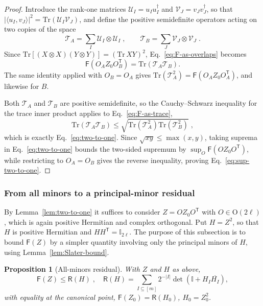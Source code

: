 \documentclass[prx,twocolumn,superscriptaddress,aps,10pt, frontmatterverbose, reprint,footinbib,longbibliography=true]{revtex4-2}
\newtheorem{proposition}{Proposition}
\newcommand{\trans}{\mathsf{T}}
\begin{document}
\begin{proof}
Introduce the rank-one matrices $\mathcal{U}_I=u_Iu_I^\dagger$ and $\mathcal{V}_J=v_Jv_J^\dagger$, so that $|\langle u_I,v_J\rangle|^2=\mathrm{Tr}(\mathcal{U}_I\mathcal{V}_J)$, and define the positive semidefinite operators acting on two copies of the space
\begin{equation}
    \mathcal{T}_A=\sum_I \mathcal{U}_I\otimes \mathcal{U}_I\;,\qquad
    \mathcal{T}_B=\sum_J \mathcal{V}_J\otimes \mathcal{V}_J\;.
\end{equation} 
Since $\mathrm{Tr}\!\left[(X\otimes X)(Y\otimes Y)\right]=\left(\mathrm{Tr}\,XY\right)^2$, Eq.~\eqref{eq:F-as-overlaps} becomes
\begin{equation}
    \mathsf{F}\!\left(O_AZ_0O_B^{\trans}\right)=\mathrm{Tr}\!\left(\mathcal{T}_A\mathcal{T}_B\right).
    \label{eq:F-as-trace}
\end{equation}
The same identity applied with $O_B=O_A$ gives $\mathrm{Tr}(\mathcal{T}_A^2)=\mathsf{F}(O_AZ_0O_A^{\trans})$, and likewise for $B$.

Both $\mathcal{T}_A$ and $\mathcal{T}_B$ are positive semidefinite, so the Cauchy--Schwarz inequality for the trace inner product applies to Eq.~\eqref{eq:F-as-trace},
\begin{equation}
    \mathrm{Tr}\!\left(\mathcal{T}_A\mathcal{T}_B\right)\le\sqrt{\mathrm{Tr}\!\left(\mathcal{T}_A^2\right)\mathrm{Tr}\!\left(\mathcal{T}_B^2\right)}\;,
\end{equation}
which is exactly Eq.~\eqref{eq:two-to-one}. Since $\sqrt{xy}\le\max(x,y)$, taking suprema in Eq.~\eqref{eq:two-to-one} bounds the two-sided supremum by $\sup_O\mathsf{F}(OZ_0O^{\trans})$, while restricting to $O_A=O_B$ gives the reverse inequality, proving Eq.~\eqref{eq:sup-two-to-one}.
\end{proof}


\subsubsection{From all minors to a principal-minor residual}
\label{app:proof:residual}

By Lemma~\ref{lem:two-to-one} it suffices to consider $Z=OZ_0O^{\trans}$ with $O\in\mathrm{O}(2\ell)$,  which is again positive Hermitian and complex orthogonal. Put $H=Z^2$, so that $H$ is positive Hermitian and $HH^{\trans}=\mathbb{I}_{2\ell}$.
The purpose of this subsection is to bound $\mathsf{F}(Z)$ by a simpler quantity involving only the principal minors of $H$, using Lemma~\ref{lem:Slater-bound}.
\begin{proposition}[All-minors residual]
\label{prop:residual}
With $Z$ and $H$ as above,
\begin{equation}
    \mathsf{F}(Z)\le \mathsf{R}(H)\;,\quad \mathsf{R}(H)=\sum_{I\subseteq[m]}2^{-|I|}\det\!\left(\mathbb{I}+H_I\overline{H_I}\right),
    \label{eq:R-definition}
\end{equation}
with equality at the canonical point, $\mathsf{F}(Z_0)=\mathsf{R}(H_0)$, $H_0=Z_0^2$.
\end{proposition}
\end{document}
